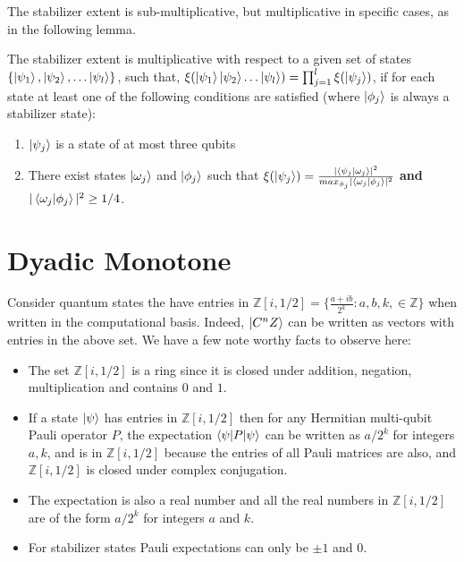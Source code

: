 \documentclass[12pt]{dalthesis}
\begin{document}
The stabilizer extent is sub-multiplicative, but multiplicative in specific cases, as in the following lemma.

\begin{lemma}
\label{stabextent}
The stabilizer extent is multiplicative with respect to a given set of states $\{ \ket{\psi_1}, \ket{\psi_2}, \dots \ket{\psi_l} \}$, such that, $\xi (\ket{\psi_1}\ket{\psi_2} \dots \ket{\psi_l}) = \prod_{j=1}^l \xi (\ket{\psi_j})$, if for each state at least one of the following conditions are satisfied (where $\ket{\phi_j}$ is always a stabilizer state):
\begin{enumerate}
\item $\ket{\psi_j}$ is a state of at most three qubits
\item There exist states $\ket{\omega_j}$ and $\ket{\phi_j}$ such that $\xi (\ket{\psi_j}) = \frac{|\braket{\psi_j| \omega_j}|^2}{max_{\phi_j}|\braket{\omega_j |\phi_j}|^2}$ \textbf{and} $|\braket{\omega_j | \phi_j}|^2 \geq 1/4$.
\end{enumerate}
\end{lemma}

\section{Dyadic Monotone}
Consider quantum states the have entries in $\mathbb{Z}[i, 1/2] = \big\{\frac{a+ib}{2^k}: a, b, k, \in \mathbb{Z} \big\}$ when written in the computational basis. Indeed, $\ket{C^nZ}$ can be written as vectors with entries in the above set. We have a few note worthy facts to observe here:
\begin{itemize}
\item The set $\mathbb{Z}[i, 1/2]$ is a ring since it is closed under addition, negation, multiplication and contains $0$ and $1$.
\item If a state $\ket{\psi}$ has entries in $\mathbb{Z}[i, 1/2]$ then for any Hermitian multi-qubit Pauli operator $P$, the expectation $\braket{\psi | P | \psi}$ can be written as $a/2^k$ for integers $a, k$, and is in $\mathbb{Z}[i, 1/2]$ because the entries of all Pauli matrices are also, and $\mathbb{Z}[i, 1/2]$ is closed under complex conjugation.
\item The expectation is also a real number and all the real numbers in $\mathbb{Z}[i, 1/2]$ are of the form $a/2^k$ for integers $a$ and $k$. 
\item For stabilizer states Pauli expectations can only be $\pm 1$ and $0$.
\end{itemize}
\end{document}
